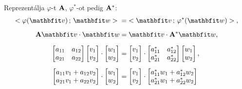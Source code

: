 \documentclass[lang=magyar]{math-handout}
\begin{document}
\begin{note}
  Reprezentálja $\varphi$-t $\mathbf{A}$, $\varphi^{*}$-ot pedig $\mathbf{A}^{*}$:
  \begin{align*}
    \scalar{\varphi(\rvec{v})}{\rvec{w}}
    \; & = \;
    \scalar{\rvec{v}}{\varphi^{*}(\rvec{w})}
    \text,
    \\[2mm]
    \rmat{A}\rvec{v} \cdot \rvec{w}
       & =
    \rvec{v} \cdot \rmat{A}^{*} \rvec{w}
    \text,
    \\[2mm]
    \begin{bmatrix}
      a_{11} & a_{12} \\
      a_{21} & a_{22}
    \end{bmatrix}
    \begin{bmatrix}
      v_1 \\ v_2
    \end{bmatrix}
    \cdot
    \begin{bmatrix}
      w_1 \\ w_2
    \end{bmatrix}
       & =
    \begin{bmatrix}
      v_1 \\ v_2
    \end{bmatrix}
    \cdot
    \begin{bmatrix}
      a_{11}^{*} & a_{12}^{*} \\
      a_{21}^{*} & a_{22}^{*}
    \end{bmatrix}
    \begin{bmatrix}
      w_1 \\ w_2
    \end{bmatrix}
    \text,
    \\[2mm]
    \begin{bmatrix}
      a_{11} v_1 + a_{12} v_2 \\
      a_{21} v_1 + a_{22} v_2
    \end{bmatrix}
    \cdot
    \begin{bmatrix}
      w_1 \\
      w_2
    \end{bmatrix}
       & =
    \begin{bmatrix}
      v_1 \\
      v_2
    \end{bmatrix}
    \cdot
    \begin{bmatrix}
      a_{11}^{*} w_1 + a_{12}^{*} w_2 \\
      a_{21}^{*} w_1 + a_{22}^{*} w_2
    \end{bmatrix}

\end{align*}
\end{note}
\end{document}
